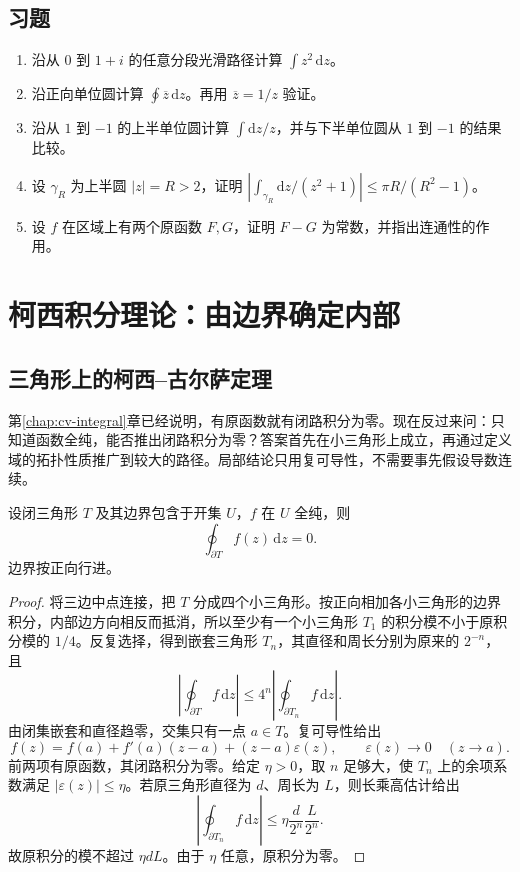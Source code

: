 \documentclass[UTF8,12pt,a4paper,fontset=fandol]{ctexbook}
\begin{document}
\section{习题}
\label{sec:cv-integral-ex}
\begin{enumerate}
 \item 沿从 $0$ 到 $1+i$ 的任意分段光滑路径计算 $\int z^2\,\mathrm dz$。
 \item 沿正向单位圆计算 $\oint\overline z\,\mathrm dz$。再用 $\overline z=1/z$ 验证。
 \item 沿从 $1$ 到 $-1$ 的上半单位圆计算 $\int\mathrm dz/z$，并与下半单位圆从 $1$ 到 $-1$ 的结果比较。
 \item 设 $\gamma_R$ 为上半圆 $|z|=R>2$，证明 $\left|\int_{\gamma_R}\mathrm dz/(z^2+1)\right|\le\pi R/(R^2-1)$。
 \item 设 $f$ 在区域上有两个原函数 $F,G$，证明 $F-G$ 为常数，并指出连通性的作用。
\end{enumerate}

\chapter{柯西积分理论：由边界确定内部}
\label{chap:cv-cauchy}

\section{三角形上的柯西--古尔萨定理}

第\ref{chap:cv-integral}章已经说明，有原函数就有闭路积分为零。现在反过来问：只知道函数全纯，能否推出闭路积分为零？答案首先在小三角形上成立，再通过定义域的拓扑性质推广到较大的路径。局部结论只用复可导性，不需要事先假设导数连续。

\begin{theorem}[柯西--古尔萨定理的三角形形式]
\label{thm:cv-goursat}
设闭三角形 $T$ 及其边界包含于开集 $U$，$f$ 在 $U$ 全纯，则
\[
 \oint_{\partial T}f(z)\,\mathrm dz=0.
\]
边界按正向行进。
\end{theorem}
\begin{proof}
将三边中点连接，把 $T$ 分成四个小三角形。按正向相加各小三角形的边界积分，内部边方向相反而抵消，所以至少有一个小三角形 $T_1$ 的积分模不小于原积分模的 $1/4$。反复选择，得到嵌套三角形 $T_n$，其直径和周长分别为原来的 $2^{-n}$，且
\[
 \left|\oint_{\partial T}f\,\mathrm dz\right|
 \le4^n\left|\oint_{\partial T_n}f\,\mathrm dz\right|.
\]
由闭集嵌套和直径趋零，交集只有一点 $a\in T$。复可导性给出
\[
 f(z)=f(a)+f'(a)(z-a)+(z-a)\varepsilon(z),
 \qquad\varepsilon(z)\to0\quad(z\to a).
\]
前两项有原函数，其闭路积分为零。给定 $\eta>0$，取 $n$ 足够大，使 $T_n$ 上的余项系数满足 $|\varepsilon(z)|\le\eta$。若原三角形直径为 $d$、周长为 $L$，则长乘高估计给出
\[
 \left|\oint_{\partial T_n}f\,\mathrm dz\right|
 \le\eta\frac d{2^n}\frac L{2^n}.
\]
故原积分的模不超过 $\eta dL$。由于 $\eta$ 任意，原积分为零。
\end{proof}
\end{document}
